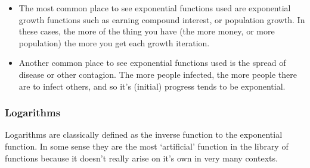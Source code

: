 \documentclass{ximeraXloud}
\begin{document}
\begin{description}
            \begin{itemize}
                \item The most common place to see exponential functions used are exponential growth functions such as earning compound interest, or population growth. In these cases, the more of the thing you have (the more money, or more population) the more you get each growth iteration. 
                \item Another common place to see exponential functions used is the spread of disease or other contagion. The more people infected, the more people there are to infect others, and so it's (initial) progress tends to be exponential.
            \end{itemize}
        \end{description}
    
    
    
    
    \subsubsection*{Logarithms}
        Logarithms are classically defined as the inverse function to the exponential function. In some sense they are the most `artificial' function in the library of functions because it doesn't really arise on it's own in very many contexts.
        
\end{document}
